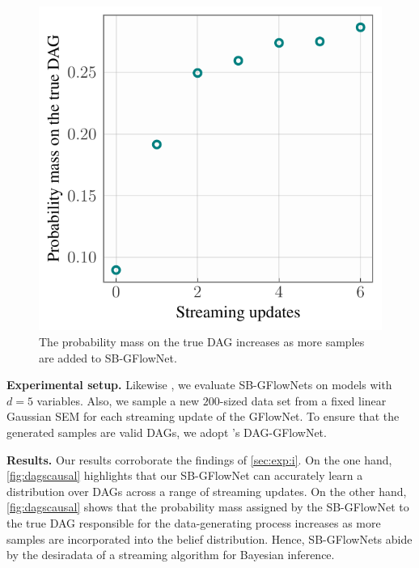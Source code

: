 \documentclass{article}
\newcommand{\pp}[1]{\vspace{0pt}\noindent\textbf{#1}}
\theoremstyle{plain}
\theoremstyle{definition}
\theoremstyle{remark}
\theoremstyle{remark}
\begin{document}
\captionsetup[figure]{font=small}
\begin{figure} 
    \vspace{-9pt} 
    \centering
    \includegraphics[width=\linewidth]{figures_rebuttal/streaming_eval_dags_true_dag_probability.pdf}
    \caption{The probability mass on the true DAG increases as more samples are added to SB-GFlowNet.}%
    \label{fig:tdagprob}
\end{figure}
\captionsetup[figure]{font=normal}
\pp{Experimental setup.} Likewise \citet[Figure 5]{deleu2022bayesian}, we evaluate SB-GFlowNets on models with $d = 5$ variables. Also, we sample a new $200$-sized data set from a fixed linear Gaussian SEM for each streaming update of the GFlowNet. To ensure that the generated samples are valid DAGs, we adopt \citet{deleu2022bayesian}'s DAG-GFlowNet.  %

\pp{Results.} Our results corroborate the findings of \autoref{sec:exp:i}. On the one hand, \autoref{fig:dagscausal} highlights that our SB-GFlowNet can accurately learn a distribution over DAGs across a range of streaming updates. %
On the other hand, \autoref{fig:dagscausal} shows that the probability mass assigned by the SB-GFlowNet to the true DAG responsible for the data-generating process increases as more samples are incorporated into the belief distribution. Hence, SB-GFlowNets abide by the desiradata of a streaming algorithm for Bayesian inference. 
\end{document}
